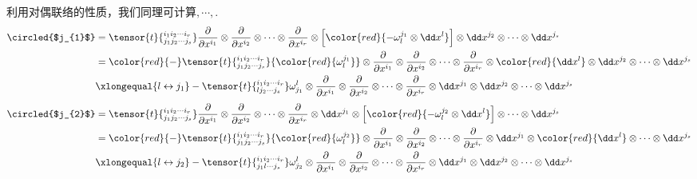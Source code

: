利用对偶联络的性质，我们同理可计算$,\cdots,$.
\[
\begin{split}
	\circled{$j_{1}$}&=\tensor{t}{^{i_{1}i_{2}\cdots i_{r}}_{j_{1}j_{2}\cdots j_{s}}}\frac { \partial } { \partial x ^ { i_{1} } }\otimes\frac { \partial } { \partial x ^ { i_{2} } }\otimes\cdots\otimes\frac { \partial } { \partial x ^ { i_{r} } }\otimes \left[  {\color{red}{-\omega_{l}^{j_{1}}\otimes \dd x^{l}}}\right]\otimes\dd x^{j_{2}}\otimes\cdots\otimes\dd x^{j_{s}}  \\
	&={\color{red}{-}}\tensor{t}{^{i_{1}i_{2}\cdots i_{r}}_{j_{1}j_{2}\cdots j_{s}}}{\color{red}{\omega_{l}^{j_{1}}}}\otimes\frac { \partial } { \partial x ^ { i_{1} } }\otimes\frac { \partial } { \partial x ^ { i_{2} } }\otimes\cdots\otimes\frac { \partial } { \partial x ^ { i_{r} } }\otimes  {\color{red}{ \dd x^{l}}}\otimes\dd x^{j_{2}}\otimes\cdots\otimes\dd x^{j_{s}}  \\
	&\xlongequal{l\leftrightarrow j_{1}}-\tensor{t}{^{i_{1}i_{2}\cdots i_{r}}_{l j_{2}\cdots j_{s}}}\omega_{j_{1}}^{l}\otimes\frac { \partial } { \partial x ^ { i_{1} } }\otimes\frac { \partial } { \partial x ^ { i_{2} } }\otimes\cdots\otimes\frac { \partial } { \partial x ^ { i_{r} } }\otimes   \dd x^{j_{1}}\otimes\dd x^{j_{2}}\otimes\cdots\otimes\dd x^{j_{s}}  \\
\end{split}
\]
\[
\begin{split}
\circled{$j_{2}$}&=\tensor{t}{^{i_{1}i_{2}\cdots i_{r}}_{j_{1}j_{2}\cdots j_{s}}}\frac { \partial } { \partial x ^ { i_{1} } }\otimes\frac { \partial } { \partial x ^ { i_{2} } }\otimes\cdots\otimes\frac { \partial } { \partial x ^ { i_{r} } }\otimes \dd x^{j_{1}}\otimes \left[  {\color{red}{-\omega_{l}^{j_{2}}\otimes \dd x^{l}}}\right]\otimes\cdots\otimes\dd x^{j_{s}}  \\
&={\color{red}{-}}\tensor{t}{^{i_{1}i_{2}\cdots i_{r}}_{j_{1}j_{2}\cdots j_{s}}}{\color{red}{\omega_{l}^{j_{2}}}}\otimes\frac { \partial } { \partial x ^ { i_{1} } }\otimes\frac { \partial } { \partial x ^ { i_{2} } }\otimes\cdots\otimes\frac { \partial } { \partial x ^ { i_{r} } }\otimes  \dd x^{j_{1}}\otimes{\color{red}{ \dd x^{l}}}\otimes\cdots\otimes\dd x^{j_{s}}  \\
&\xlongequal{l\leftrightarrow j_{2}}-\tensor{t}{^{i_{1}i_{2}\cdots i_{r}}_{j_{1} l\cdots j_{s}}}\omega_{j_{2}}^{l}\otimes\frac { \partial } { \partial x ^ { i_{1} } }\otimes\frac { \partial } { \partial x ^ { i_{2} } }\otimes\cdots\otimes\frac { \partial } { \partial x ^ { i_{r} } }\otimes   \dd x^{j_{1}}\otimes\dd x^{j_{2}}\otimes\cdots\otimes\dd x^{j_{s}}  \\
\end{split}
\]
